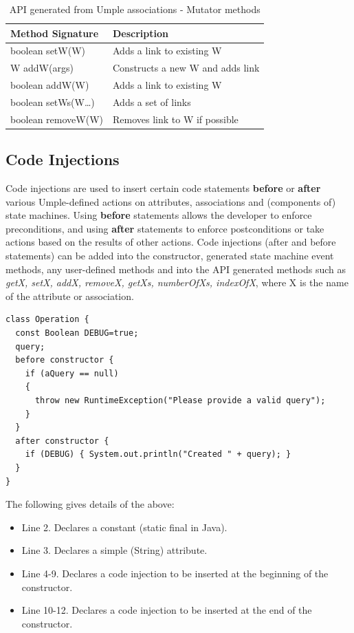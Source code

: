 \begin{table}[h]
\centering
 \caption{API generated from Umple associations - Mutator methods \cite{UmpleAPI}}
\label{table:apiAssocs2}
\begin{tabular}{l|l}
\toprule
\rowcolor[HTML]{BBDAFF}
\textbf{Method Signature} & \textbf{Description}     \\ \midrule
boolean setW(W)   & Adds a link to existing W	\\ 
W addW(args)    & Constructs a new W and adds link      \\ 
boolean addW(W)  & Adds a link to existing W            \\ 
boolean setWs(W…)    & Adds a set of links              \\ 
 boolean removeW(W) &   Removes link to W if possible   \\
 \bottomrule
\end{tabular}
\end{table}

\subsection{Code Injections}
Code injections are used to insert certain code statements \textbf{before} or \textbf{after} various Umple-defined actions on attributes, associations and (components of) state machines. Using \textbf{before} statements allows the developer to enforce preconditions, and using \textbf{after} statements to enforce postconditions or take actions based on the results of other actions. Code injections (after and before statements) can be added into the constructor, generated state machine event methods, any user-defined methods and into the API generated methods such as \textit{getX, setX, addX, removeX, getXs, numberOfXs, indexOfX}, where X is the name of the attribute or association.

\begin{lstlisting}[style=umpleOut,label={lst:codeInjection},caption=A code injection into the constructor]
class Operation {  
  const Boolean DEBUG=true;  
  query;  
  before constructor {  
    if (aQuery == null)  
    {  
      throw new RuntimeException("Please provide a valid query");  
    }  
  }  
  after constructor {  
    if (DEBUG) { System.out.println("Created " + query); }  
  }  
}  
\end{lstlisting}

The following gives details of the above:
\begin{itemize}
\item Line 2. Declares a constant (static final in Java). 
\item Line 3. Declares a simple (String) attribute.   	 
\item Line 4-9. Declares a code injection to be inserted at the beginning of the constructor.  
\item Line 10-12. Declares a code injection to be inserted at the end of the constructor.      
\end{itemize}

